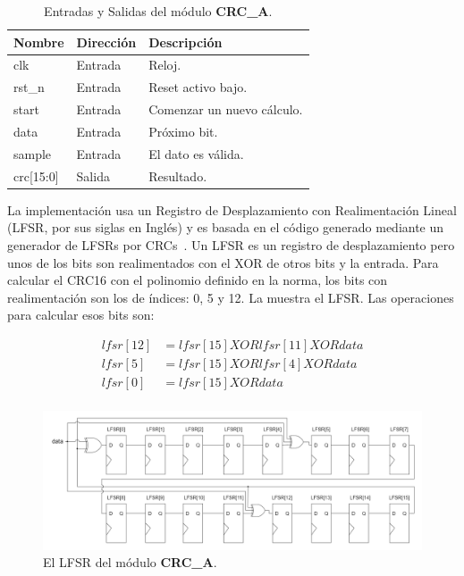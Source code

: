 \documentclass[a4paper, twoside, 11pt]{report}
\begin{document}
\begin{table}[htb]
  \centering
  \tablezebra
  \begin{tabulary}{\linewidth}{l|l|L}
    \textbf{Nombre}&\textbf{Dirección}&\textbf{Descripción} \\
    \hline
    clk&Entrada&Reloj. \\
    rst\_n&Entrada&Reset activo bajo. \\
    start&Entrada&Comenzar un nuevo cálculo. \\
    data&Entrada&Próximo bit. \\
    sample&Entrada&El dato es válida. \\
    crc[15:0]&Salida&Resultado. \\
  \end{tabulary}
  \caption{Entradas y Salidas del módulo \textbf{CRC\_A}.}
  \label{tab:ports_crc_a}
\end{table}

La implementación usa un Registro de Desplazamiento con Realimentación Lineal (LFSR, por sus siglas en Inglés) y es basada en el código generado mediante un generador de LFSRs por CRCs~\cite{crcgen}. Un LFSR es un registro de desplazamiento pero unos de los bits son realimentados con el XOR de otros bits y la entrada. Para calcular el CRC16 con el polinomio definido en la norma, los bits con realimentación son los de índices: 0, 5 y 12. La  muestra el LFSR. Las operaciones para calcular esos bits son:

\begin{align*}
  lfsr[12] &= lfsr[15] XOR lfsr[11] XOR data \\
  lfsr[5]  &= lfsr[15] XOR lfsr[4] XOR data \\
  lfsr[0]  &= lfsr[15] XOR data \\
\end{align*}

\begin{figure}[htb]
  \centering
  \includegraphics[width=1.0\textwidth]{./img/crc_a_lfsr}
  \caption{El LFSR del módulo \textbf{CRC\_A}.}
  \label{fig:crc_lfsr}
\end{figure}
\end{document}
